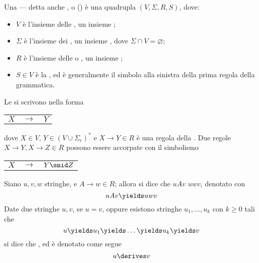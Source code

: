 \documentclass[a4paper, 12pt]{report}
\begin{document}
    \begin{frameddefn}[breakable]{\CFG}
        Una  --- detta anche , o \CFG () è una quadrupla $(V, \Sigma, R, S)$, dove:

        \begin{itemize}
            \item $V$ è l'insieme delle , un insieme ;
            \item $\Sigma$ è l'insieme dei , un insieme , dove $\Sigma \cap V = \varnothing$;
            \item $R$ è l'insieme delle  o , un insieme ;
            \item $S \in V$ è la , ed è generalmente il simbolo alla sinistra della prima regola della grammatica.
        \end{itemize}

        Le \CFG si scrivono nella forma

        \begin{center}
            \begin{tabular}{rcl}
                $X$ & $\to$ & $Y$ \\
            \end{tabular}
        \end{center}

        dove $X \in V$, $Y \in (V \cup \Sigma_\epsilon)^*$ e $X \to Y \in R$ è una regola della \CFG. Due regole $X \to Y, X \to Z \in R$ possono essere accorpate con il simbolismo

        \begin{center}
            \begin{tabular}{rcl}
                $X$ & $\to$ & $Y \smid Z$ \\
            \end{tabular}
        \end{center}

        Siano $u, v, w$ stringhe, e $A \to w \in R$; allora si dice che $uAv$  $uwv$, denotato con $$uAv \yields uwv$$ Date due stringhe $u, v$, se $u = v$, oppure esistono stringhe $u_1, \ldots, u_k$ con $k \ge 0$ tali che $$u \yields u_1 \yields \ldots \yields u_k \yields v$$ si dice che , ed è denotato come segue $$u \derives v$$
    \end{frameddefn}
\end{document}
